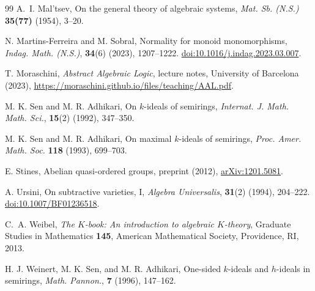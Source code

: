 \documentclass[12pt,english]{amsart}
\theoremstyle{definition}
\numberwithin{equation}{section}
\theoremstyle{remark}
\begin{document}
\begin{thebibliography}{99}
A.~I. Mal'tsev, On the general theory of algebraic systems,
\textit{Mat. Sb. (N.S.)} \textbf{35(77)} (1954), 3--20.

N. Martins-Ferreira and M. Sobral, Normality for monoid monomorphisms,
\textit{Indag. Math. (N.S.)}, \textbf{34}(6) (2023), 1207--1222.
\href{https://doi.org/10.1016/j.indag.2023.03.007}{doi:10.1016/j.indag.2023.03.007}.

T. Moraschini, \textit{Abstract Algebraic Logic},
lecture notes, University of Barcelona (2023),
\url{https://moraschini.github.io/files/teaching/AAL.pdf}.

M. K. Sen and M. R. Adhikari, On $k$-ideals of semirings, \textit{Internat. J. Math.  Math. Sci.}, \textbf{15}(2) (1992), 347--350.

M. K. Sen and M. R. Adhikari, On maximal $k$-ideals of semirings, \textit{Proc. Amer. Math.
Soc.} \textbf{118} (1993), 699--703.

E. Stines, Abelian quasi-ordered groups, preprint (2012),
\href{https://arxiv.org/abs/1201.5081}{arXiv:1201.5081}.

A. Ursini, On subtractive varieties, I, \textit{Algebra Universalis},
\textbf{31}(2) (1994), 204--222.
\href{https://doi.org/10.1007/BF01236518}{doi:10.1007/BF01236518}.

C.~A. Weibel, \emph{The $K$-book: An introduction to algebraic
$K$-theory}, Graduate Studies in Mathematics \textbf{145},
American Mathematical Society, Providence, RI, 2013.

H. J. Weinert, M. K. Sen, and M. R. Adhikari, One-sided $k$-ideals and $h$-ideals in
semirings, \textit{Math. Pannon.}, \textbf{7} (1996), 147--162.
\end{thebibliography}
\end{document}

